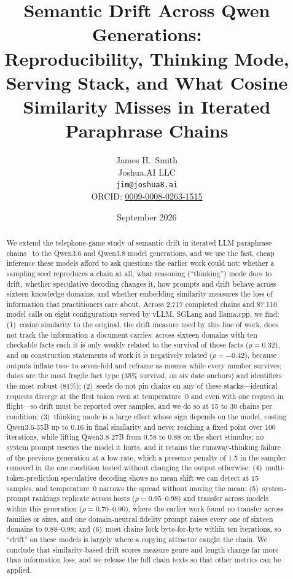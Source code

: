 \documentclass[11pt]{article}
\title{Semantic Drift Across Qwen Generations:\\
Reproducibility, Thinking Mode, Serving Stack, and What Cosine Similarity
Misses in Iterated Paraphrase Chains}
\author{
  James H.\ Smith \\
  Joshua.AI LLC \\
  \texttt{jim@joshua8.ai} \\
  ORCID: \href{https://orcid.org/0009-0008-0263-1515}{0009-0008-0263-1515}
}
\date{September 2026}
\begin{document}
\maketitle

\begin{abstract}
We extend the telephone-game study of semantic drift in iterated LLM
paraphrase chains~\citep{smith2026drift} to the Qwen3.6 and Qwen3.8 model
generations, and we use the fast, cheap inference these models afford to ask
questions the earlier work could not: whether a sampling seed reproduces a
chain at all, what reasoning (``thinking'') mode does to drift, whether
speculative decoding changes it, how prompts and drift behave across sixteen
knowledge domains, and whether embedding similarity measures the loss of
information that practitioners care about. Across 2{,}717 completed chains
and 87{,}110 model calls on eight configurations served by vLLM, SGLang and
llama.cpp, we find:
(1)~cosine similarity to the original, the drift measure used by this line
of work, does not track the information a document carries: across sixteen
domains with ten checkable facts each it is only weakly related to the
survival of those facts ($\rho=0.32$), and on construction statements of
work it is negatively related ($\rho=-0.42$), because outputs inflate two-
to seven-fold and reframe as memos while every number survives; dates are
the most fragile fact type (35\% survival, on six date anchors) and
identifiers the most robust (81\%);
(2)~seeds do not pin chains on any of these stacks---identical requests
diverge at the first token even at temperature~0 and even with one request in
flight---so drift must be reported over samples, and we do so at 15 to 30
chains per condition;
(3)~thinking mode is a large effect whose sign depends on the model, costing
Qwen3.6-35B up to 0.16 in final similarity and never reaching a fixed point
over 100 iterations, while lifting Qwen3.8-27B from 0.58 to 0.88 on the short
stimulus; no system prompt rescues the model it hurts, and it retains the
runaway-thinking failure of the previous generation at a low rate, which a
presence penalty of 1.5 in the sampler removed in the one condition tested
without changing the output otherwise;
(4)~multi-token-prediction speculative decoding shows no mean shift we can
detect at 15 samples, and temperature~0 narrows the spread without moving
the mean;
(5)~system-prompt rankings replicate across hosts ($\rho=0.95$--$0.98$) and
transfer across models within this generation ($\rho=0.70$--$0.90$), where
the earlier work found no transfer across families or sizes, and one
domain-neutral fidelity prompt raises every one of sixteen domains to
0.88--0.98; and
(6)~most chains lock byte-for-byte within ten iterations, so ``drift'' on
these models is largely where a copying attractor caught the chain.
We conclude that similarity-based drift scores measure genre and length
change far more than information loss, and we release the full chain texts
so that other metrics can be applied.
\end{abstract}
\end{document}
